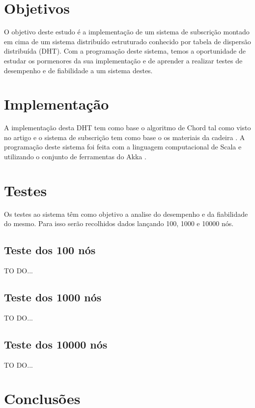 \documentclass[12pt]{article}
\begin{document}
\newpage
\section{Objetivos}

O objetivo deste estudo é a implementação de um sistema de subscrição montado em cima de um sistema distribuído estruturado conhecido por tabela de dispersão distribuída (DHT). Com a programação deste sistema, temos a oportunidade de estudar os pormenores da sua implementação e de aprender a realizar testes de desempenho e de fiabilidade a um sistema destes.

\newpage
\section{Implementação}

A implementação desta DHT tem como base o algoritmo de Chord tal como visto no artigo \cite{b2} e o sistema de subscrição tem como base o os materiais da cadeira \cite{b1}. A programação deste sistema foi feita com a linguagem computacional de Scala \cite{b3} e utilizando o conjunto de ferramentas do Akka \cite{b4}.

\newpage
\section{Testes}

Os testes ao sistema têm como objetivo a analise do desempenho e da fiabilidade do mesmo. Para isso serão recolhidos dados lançando 100, 1000 e 10000 nós.

\subsection{Teste dos 100 nós}

TO DO...

\subsection{Teste dos 1000 nós}

TO DO...

\subsection{Teste dos 10000 nós}

TO DO...

\newpage
\section{Conclusões}
\end{document}

